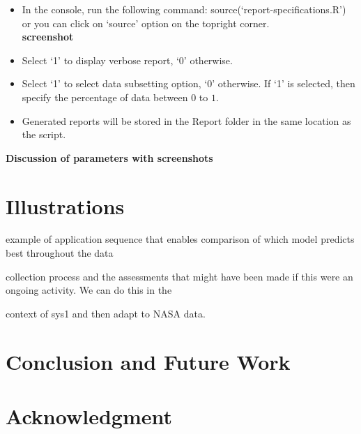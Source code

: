 \documentclass[journal]{IEEEtran}
\begin{document}
\begin{itemize}
{  }
  \item {In the console, run the following command: source(‘report-specifications.R’) or you can click on ‘source’ option on the topright corner.\\
  \textbf{screenshot}}
  \item {Select ‘1’ to display verbose report, `0' otherwise.}
  \item {Select ‘1’ to select data subsetting option, `0' otherwise. If `1' is selected, then specify the percentage of data between $0$ to $1$.}
  \item {Generated reports will be stored in the Report folder in the same location as the script.}
\end{itemize}



\textbf{Discussion of parameters with screenshots}


\section{Illustrations}\label{sec:Ex}
example of application sequence that enables comparison of which model predicts best throughout the data

collection process and the assessments that might have been made if this were an ongoing activity. We can do this in the

context of sys1 and then adapt to NASA data.


\section{Conclusion and Future Work}\label{sec:Concl}


\section*{Acknowledgment}\label{sec:Ack}




\end{document}
